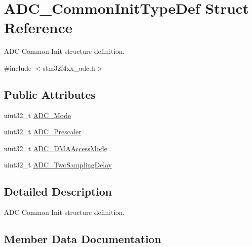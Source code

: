 \hypertarget{struct_a_d_c___common_init_type_def}{}\section{A\+D\+C\+\_\+\+Common\+Init\+Type\+Def Struct Reference}
\label{struct_a_d_c___common_init_type_def}


A\+DC Common Init structure definition.  




{\ttfamily \#include $<$stm32f4xx\+\_\+adc.\+h$>$}

\subsection*{Public Attributes}
\begin{DoxyCompactItemize}
\item 
uint32\+\_\+t \hyperlink{struct_a_d_c___common_init_type_def_a9ac2a96e9bbbec4b680ab250051a7b54}{A\+D\+C\+\_\+\+Mode}
\item 
uint32\+\_\+t \hyperlink{struct_a_d_c___common_init_type_def_a4b968331be8f4a43ef31c18f4422df4b}{A\+D\+C\+\_\+\+Prescaler}
\item 
uint32\+\_\+t \hyperlink{struct_a_d_c___common_init_type_def_a421063e29be85798195ea5f2e6c26fbd}{A\+D\+C\+\_\+\+D\+M\+A\+Access\+Mode}
\item 
uint32\+\_\+t \hyperlink{struct_a_d_c___common_init_type_def_a2828abd59ed1777ae66c642d89be410e}{A\+D\+C\+\_\+\+Two\+Sampling\+Delay}
\end{DoxyCompactItemize}


\subsection{Detailed Description}
A\+DC Common Init structure definition. 

\subsection{Member Data Documentation}
